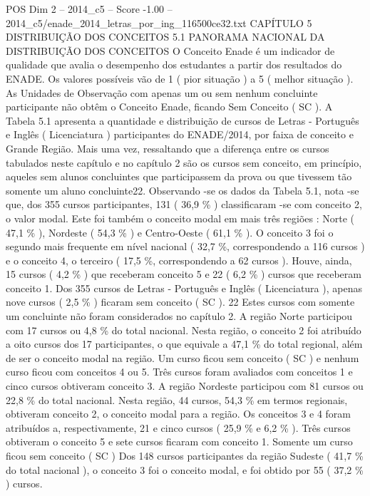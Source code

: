 \begin{textsample}{POS Dim 2 – 2014\_c5 – Score -1.00 – 2014\_c5/enade\_2014\_letras\_por\_ing\_116500ce32.txt}  \label{ex:f2_pos_312}
CAPÍTULO 5 DISTRIBUIÇÃO DOS CONCEITOS 5.1 PANORAMA NACIONAL DA DISTRIBUIÇÃO DOS CONCEITOS O Conceito Enade é um indicador de qualidade que avalia o desempenho dos estudantes a partir dos resultados do ENADE.
Os valores possíveis vão de 1 ( pior situação ) a 5 ( melhor situação ).
As Unidades de Observação com apenas um ou sem nenhum concluinte participante não obtêm o Conceito Enade, ficando Sem Conceito ( SC ).
A Tabela 5.1 apresenta a quantidade e distribuição de cursos de Letras - Português e Inglês ( Licenciatura ) participantes do ENADE/2014, por faixa de conceito e Grande Região.
Mais uma vez, ressaltando que a diferença entre os cursos tabulados neste capítulo e no capítulo 2 são os cursos sem conceito, em princípio, aqueles sem alunos concluintes que participassem da prova ou que tivessem tão somente um aluno concluinte22.
Observando -se os dados da Tabela 5.1, nota -se que, dos 355 cursos participantes, 131 ( 36,9 \% ) classificaram -se com conceito 2, o valor modal.
Este foi também o conceito modal em mais três regiões : Norte ( 47,1 \% ), Nordeste ( 54,3 \% ) e Centro-Oeste ( 61,1 \% ).
O conceito 3 foi o segundo mais frequente em nível nacional ( 32,7 \%, correspondendo a 116 cursos ) e o conceito 4, o terceiro ( 17,5 \%, correspondendo a 62 cursos ).
Houve, ainda, 15 cursos ( 4,2 \% ) que receberam conceito 5 e 22 ( 6,2 \% ) cursos que receberam conceito 1.
Dos 355 cursos de Letras - Português e Inglês ( Licenciatura ), apenas nove cursos ( 2,5 \% ) ficaram sem conceito ( SC ). 22 Estes cursos com somente um concluinte não foram considerados no capítulo 2.
A região Norte participou com 17 cursos ou 4,8 \% do total nacional.
Nesta região, o conceito 2 foi atribuído a oito cursos dos 17 participantes, o que equivale a 47,1 \% do total regional, além de ser o conceito modal na região.
Um curso ficou sem conceito ( SC ) e nenhum curso ficou com conceitos 4 ou 5.
Três cursos foram avaliados com conceitos 1 e cinco cursos obtiveram conceito 3.
A região Nordeste participou com 81 cursos ou 22,8 \% do total nacional.
Nesta região, 44 cursos, 54,3 \% em termos regionais, obtiveram conceito 2, o conceito modal para a região.
Os conceitos 3 e 4 foram atribuídos a, respectivamente, 21 e cinco cursos ( 25,9 \% e 6,2 \% ).
Três cursos obtiveram o conceito 5 e sete cursos ficaram com conceito 1.
Somente um curso ficou sem conceito ( SC ) Dos 148 cursos participantes da região Sudeste ( 41,7 \% do total nacional ), o conceito 3 foi o conceito modal, e foi obtido por 55 ( 37,2 \% ) cursos.

\end{textsample}
